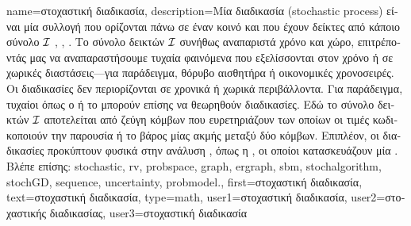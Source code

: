 {name={\foreignlanguage{greek}{στοχαστική διαδικασία}},
	description={\foreignlanguage{greek}{Μία}  
		\foreignlanguage{greek}{διαδικασία} (stochastic process) \foreignlanguage{greek}{είναι μία συλλογή}  
		\foreignlanguage{greek}{που ορίζονται πάνω σε έναν κοινό}  \foreignlanguage{greek}{και που έχουν δείκτες 
		από κάποιο σύνολο} $\mathcal{I}$ \cite{papoulis}, \cite{GrayProbBook}, \cite{Brockwell91}. \foreignlanguage{greek}{Το σύνολο δεικτών 
		$\mathcal{I}$ συνήθως αναπαριστά χρόνο και χώρο, επιτρέποντάς μας να αναπαραστήσουμε τυχαία φαινόμενα που 
		εξελίσσονται στον χρόνο ή σε χωρικές διαστάσεις—για παράδειγμα, θόρυβο αισθητήρα ή οικονομικές χρονοσειρές}.
		\foreignlanguage{greek}{Οι}  \foreignlanguage{greek}{διαδικασίες δεν περιορίζονται σε 
		χρονικά ή χωρικά περιβάλλοντα. Για παράδειγμα, τυχαίοι}  \foreignlanguage{greek}{όπως ο} 
		 \foreignlanguage{greek}{ή το}  \foreignlanguage{greek}{μπορούν επίσης να θεωρηθούν} 
		 \foreignlanguage{greek}{διαδικασίες. Εδώ το σύνολο δεικτών $\mathcal{I}$ αποτελείται 
		από ζεύγη κόμβων που ευρετηριάζουν}  \foreignlanguage{greek}{των οποίων οι τιμές κωδικοποιούν 
		την παρουσία ή το βάρος μίας ακμής μεταξύ δύο κόμβων. Επιπλέον, οι}  
		\foreignlanguage{greek}{διαδικασίες προκύπτουν φυσικά στην ανάλυση} , 
		\foreignlanguage{greek}{όπως η} , \foreignlanguage{greek}{οι οποίοι κατασκευάζουν μία} 
		 . 
		\\
		\foreignlanguage{greek}{Βλέπε επίσης:} \gls{stochastic}, \gls{rv}, \gls{probspace}, \gls{graph}, \gls{ergraph}, \gls{sbm},
		\gls{stochalgorithm}, \gls{stochGD}, \gls{sequence}, \gls{uncertainty}, \gls{probmodel}.},
	first={\foreignlanguage{greek}{στοχαστική διαδικασία}},
	text={\foreignlanguage{greek}{στοχαστική διαδικασία}},
	type=math,
	user1={\foreignlanguage{greek}{στοχαστική διαδικασία}}, %
  	user2={\foreignlanguage{greek}{στοχαστικής διαδικασίας}}, %
	user3={\foreignlanguage{greek}{στοχαστική διαδικασία}} %
}

